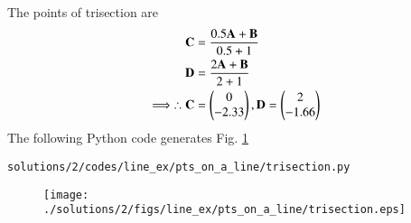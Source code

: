 The points of trisection are
 \begin{align}
\mathbf{C} &= \frac{0.5\mathbf{A}+\mathbf{B}}{0.5+1} \\
\mathbf{D} &= \frac{2\mathbf{A}+\mathbf{B}}{2+1}\\
\implies \therefore \mathbf{C} &= \begin{pmatrix}0\\-2.33\end{pmatrix},
\mathbf{D} = \begin{pmatrix}2\\-1.66\end{pmatrix}
\end{align}
The following Python code generates Fig. \ref{fig:3.6.2_trisection_pts_on_a_line}
\begin{lstlisting}
solutions/2/codes/line_ex/pts_on_a_line/trisection.py
\end{lstlisting}

\begin{figure}[!ht]
\centering
\texttt{[image: ./solutions/2/figs/line\_ex/pts\_on\_a\_line/trisection.eps]}
\caption{}
\label{fig:3.6.2_trisection_pts_on_a_line}
\end{figure} 


